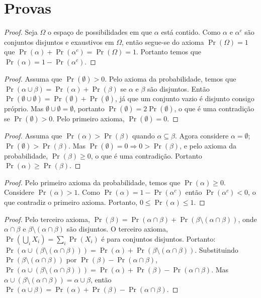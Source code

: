 \documentclass{amsart}
\theoremstyle{plain}
\numberwithin{equation}{subsection}
\renewcommand{\implies}{\Rightarrow}
\begin{document}

\newpage
\appendix
\section{Provas}

\complement*
\begin{proof}
  Seja $\Omega$ o espaço de possibilidades em que $\alpha$ está contido. Como $\alpha$ e $\alpha^c$
  são conjuntos disjuntos e exaustivos em $\Omega$, então segue-se do axioma $\Pr(\Omega)=1$ que
  $\Pr(\alpha)+\Pr(\alpha^c)=\Pr(\Omega)=1$. Portanto temos que $\Pr(\alpha)=1-\Pr(\alpha^c)$.
\end{proof}

\nullevent*
\begin{proof}
  Assuma que $\Pr(\emptyset)>0$. Pelo axioma da probabilidade, temos que $\Pr(\alpha\cup\beta)=
  \Pr(\alpha)+\Pr(\beta)$ se $\alpha$ e $\beta$ são disjuntos. Então $\Pr(\emptyset\cup\emptyset)=
  \Pr(\emptyset)+\Pr(\emptyset)$, já que um conjunto vazio é disjunto consigo próprio. Mas
  $\emptyset\cup\emptyset=\emptyset$, portanto $\Pr(\emptyset)=2\Pr(\emptyset)$, o que é uma
  contradição se $\Pr(\emptyset)>0$. Pelo primeiro axioma, $\Pr(\emptyset)=0$.
\end{proof}

\monotonicity*
\begin{proof}
  Assuma que $\Pr(\alpha)>\Pr(\beta)$ quando $\alpha\subseteq\beta$. Agora considere $\alpha=
  \emptyset$; $\Pr(\emptyset)>\Pr(\beta)$. Mas $\Pr(\emptyset)=0\implies 0>\Pr(\beta)$, e pelo
  axioma da probabilidade, $\Pr(\beta)\geq 0$, o que é uma contradição. Portanto $\Pr(\alpha)\geq
  \Pr(\beta)$.
\end{proof}

\interval*
\begin{proof}
  Pelo primeiro axioma da probabilidade, temos que $\Pr(\alpha)\geq 0$. Considere $\Pr(\alpha)>1$.
  Como $\Pr(\alpha)=1-\Pr(\alpha^c)$ então $\Pr(\alpha^c)<0$, o que contradiz o primeiro axioma.
  Portanto, $0\leq\Pr(\alpha)\leq 1$.
\end{proof}

\union*
\begin{proof}
  Pelo terceiro axioma, $\Pr(\beta)=\Pr(\alpha\cap\beta)+\Pr(\beta\setminus(\alpha\cap\beta))$,
  onde $\alpha\cap\beta$ e $\beta\setminus(\alpha\cap\beta)$ são disjuntos. O terceiro axioma,
  $\Pr(\bigcup_i X_i)=\sum_i\Pr(X_i)$ é para conjuntos disjuntos. Portanto: $\Pr(\alpha\cup(\beta
  \setminus(\alpha\cap\beta)))=\Pr(\alpha)+\Pr(\beta\setminus(\alpha\cap\beta))$. Substituindo
  $\Pr(\beta\setminus(\alpha\cap\beta))$ por $\Pr(\beta)-\Pr(\alpha\cap\beta)$, $\Pr(\alpha\cup(
  \beta\setminus(\alpha\cap\beta)))=\Pr(\alpha)+\Pr(\beta)-\Pr(\alpha\cap\beta)$. Mas $\alpha\cup(
  \beta\setminus(\alpha\cap\beta))=\alpha\cup\beta$, então $\Pr(\alpha\cup\beta)=\Pr(\alpha)+\Pr(
  \beta)-\Pr(\alpha\cap\beta)$.
\end{proof}
\end{document}
